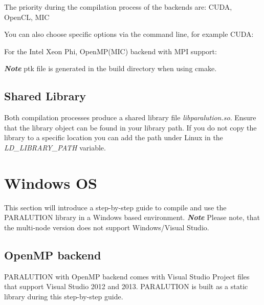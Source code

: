 The priority during the compilation process of the backends are: CUDA, OpenCL, MIC

You can also choose specific options via the command line, for example CUDA:


For the Intel Xeon Phi, OpenMP(MIC) backend with MPI support:


\textbf{\emph{Note}} ptk file is generated in the build directory when using cmake.

\subsection{Shared Library}
Both compilation processes produce a shared library file \emph{libparalution.so}. Ensure that the library object can be found in your library path. If you do not copy the library to a specific location you can add the path under Linux in the \emph{LD\_LIBRARY\_PATH} variable.



\section{Windows OS}

This section will introduce a step-by-step guide to compile and use the PARALUTION library in a Windows based environment.
\textbf{\emph{Note}} Please note, that the multi-node version does not support Windows/Visual Studio.

\subsection{OpenMP backend}

PARALUTION with OpenMP backend comes with Visual Studio Project files that support Visual Studio 2012 and 2013. PARALUTION is built as a static library during this step-by-step guide.

